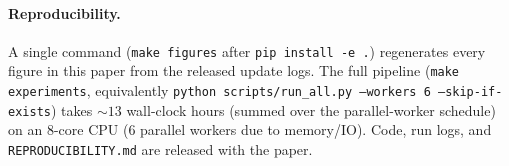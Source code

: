 \documentclass{article}
\begin{document}
\paragraph{Reproducibility.}
A single command (\texttt{make figures} after \texttt{pip install -e .}) regenerates every figure in this paper from the released update logs. The full pipeline (\texttt{make experiments}, equivalently \texttt{python scripts/run\_all.py --workers 6 --skip-if-exists}) takes $\sim 13$ wall-clock hours (summed over the parallel-worker schedule) on an 8-core CPU (6 parallel workers due to memory/IO). Code, run logs, and \texttt{REPRODUCIBILITY.md} are released with the paper.

\newpage

\end{document}
